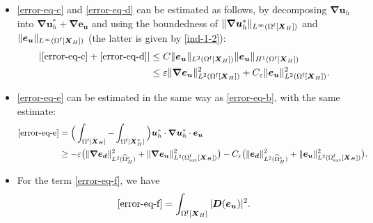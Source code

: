 \documentclass[11pt,reqno]{amsart}
\theoremstyle{definition}
\theoremstyle{plain}
\numberwithin{theorem}{section}
\numberwithin{proposition}{section}
\numberwithin{lemma}{section}
\numberwithin{equation}{section}
\newcommand{\bs}[1]{\boldsymbol{#1}}
\newcommand{\uu}[1]  {{\bs{#1}} }
\newcommand{\dep}{{{\bs{d}}}}
\newcommand{\grad}   { \uu{\nabla}    }
\renewcommand{\(}{\bigl(}
\renewcommand{\)}{\bigr)}
\begin{document}
\begin{itemize}[leftmargin=20pt]
\item \eqref{error-eq-c} and \eqref{error-eq-d} can be estimated as follows, by decomposing $\grad{\bs u}_h$ into $\grad{\bs u}_h^* + \grad{\bs e}_{\bs u}$ and using the boundedness of $\|\grad{\bs u}_h^*\|_{L^\infty(\Omega^{\rm f}[\bs X_H])}$ and $\|{\bs e}_{\bs u}\|_{L^\infty(\Omega^{\rm f}[\bs X_H])}$ (the latter is given by \eqref{ind-1-2}):
\begin{align}
| \eqref{error-eq-c} + \eqref{error-eq-d} |
&\le C\|{\bs e}_{\bs u}\|_{L^2(\Omega^{\rm f}[\bs X_H])} \|{\bs e}_{\bs u}\|_{H^1(\Omega^{\rm f}[\bs X_H])} \notag\\
&\le \varepsilon \|\grad {\bs e}_{\bs u}\|_{L^2(\Omega^{\rm f}[\bs X_H])}^2 
+ C_{\varepsilon} \|{\bs e}_{\bs u}\|_{L^2(\Omega^{\rm f}[\bs X_H])}^2 . 
\end{align}

\item \eqref{error-eq-e} can be estimated in the same way as \eqref{error-eq-b}, with the same estimate: 
\begin{equation}\label{eq:estima3}
\begin{aligned}
\eqref{error-eq-e} & = \Big( \int_{\Omega^{\rm f}[\bs X_H]} - \int_{\Omega^{\rm f}[\bs X_H^*]} \Big) {\bs u}_h^* \cdot \grad {\bs u}_h^* \cdot {\bs e}_{\bs u} \\
&\ge - \varepsilon  \big( \|\grad {\bs e}_\dep\|_{L^2(\widehat{\Omega}^{\rm s}_H)}^2 +  \|\grad {\bs e}_{\bs u}\|_{L^2(\Omega^{\rm f}_{\rm ext}[\bs X_H])}^2 \big) 
- C_{\varepsilon} \big(\|{\bs e}_\dep\|_{L^2(\widehat{\Omega}^{\rm s}_H)}^2 + \|{\bs e}_{\bs u}\|_{L^2(\Omega^{\rm f}_{\rm ext}[\bs X_H])}^2 \big) . 
\end{aligned}
\end{equation}

\item For the term \eqref{error-eq-f}, we have 
$$
\eqref{error-eq-f} = \int_{\Omega^{\rm f}[\bs X_H]} | {\bs D}({\bs e}_{\bs u}) |^2 .
$$


\end{itemize}
\end{document}
